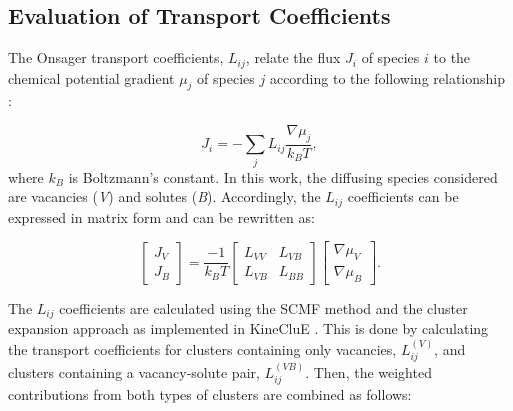 \documentclass[preprint,12pt]{elsarticle}
\begin{document}
\subsection{Evaluation of Transport Coefficients}

\noindent The Onsager transport coefficients, $L_{ij}$, relate the flux $J_i$ of species $i$ to the chemical potential gradient $\mu_j$ of species $j$ according to the following relationship \cite{allnatt_atomic_2003}:

\begin{equation}
   J_i = -\sum_j{L_{ij} \frac{\nabla\mu_j}{k_B T}} ,
\label{eq_onsager}
\end{equation}
where $k_B$ is Boltzmann's constant. In this work, the diffusing species considered are vacancies (\textit{V}) and solutes (\textit{B}). Accordingly, the $L_{ij}$ coefficients can be expressed in matrix form and  can be rewritten as:

\begin{equation}
\label{matrix_form_onsager}
    \begin{bmatrix}
        J_V \\
        J_B 
    \end{bmatrix}=\frac{-1}{k_B T}
    \begin{bmatrix}
    L_{VV} & L_{VB} \\
    L_{VB} & L_{BB}
    \end{bmatrix}
        \begin{bmatrix}
        \nabla\mu_V \\
        \nabla\mu_B
    \end{bmatrix}.
\end{equation}

\noindent The $L_{ij}$ coefficients are calculated using the SCMF method \cite{nastar_self-consistent_2000, nastar_mean_2005} and the cluster expansion approach as implemented in KineCluE \cite{schuler_kineclue_2020}. This is done by calculating the transport coefficients for clusters containing only vacancies, $L_{ij}^{(V)}$, and clusters containing a vacancy-solute pair, $L_{ij}^{(VB)}$. Then, the weighted contributions from both types of clusters are combined as follows:
\end{document}
